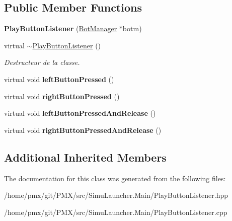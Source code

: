 \subsection*{Public Member Functions}
\begin{DoxyCompactItemize}
\item 
\mbox{\label{classPlayButtonListener_ac54ca384b702e26883271b80a66c09aa}} 
{\bfseries Play\+Button\+Listener} (\hyperlink{classBotManager}{Bot\+Manager} $\ast$botm)
\item 
\mbox{\label{classPlayButtonListener_a1e7d65adef32bbd8d771442d67e00a6c}} 
virtual \hyperlink{classPlayButtonListener_a1e7d65adef32bbd8d771442d67e00a6c}{$\sim$\+Play\+Button\+Listener} ()
\begin{DoxyCompactList}\small\item\em Destructeur de la classe. \end{DoxyCompactList}\item 
\mbox{\label{classPlayButtonListener_a4fa925e90bacb9e73295732bc3dce8f9}} 
virtual void {\bfseries left\+Button\+Pressed} ()
\item 
\mbox{\label{classPlayButtonListener_a384d9398ae39697444e255e46ef24d00}} 
virtual void {\bfseries right\+Button\+Pressed} ()
\item 
\mbox{\label{classPlayButtonListener_af361ea2161c90188b50eb44d2ffa7b45}} 
virtual void {\bfseries left\+Button\+Pressed\+And\+Release} ()
\item 
\mbox{\label{classPlayButtonListener_a2099308003651fb7f18c7d980b87f62a}} 
virtual void {\bfseries right\+Button\+Pressed\+And\+Release} ()
\end{DoxyCompactItemize}
\subsection*{Additional Inherited Members}


The documentation for this class was generated from the following files\+:\begin{DoxyCompactItemize}
\item 
/home/pmx/git/\+P\+M\+X/src/\+Simu\+Launcher.\+Main/Play\+Button\+Listener.\+hpp\item 
/home/pmx/git/\+P\+M\+X/src/\+Simu\+Launcher.\+Main/Play\+Button\+Listener.\+cpp\end{DoxyCompactItemize}
